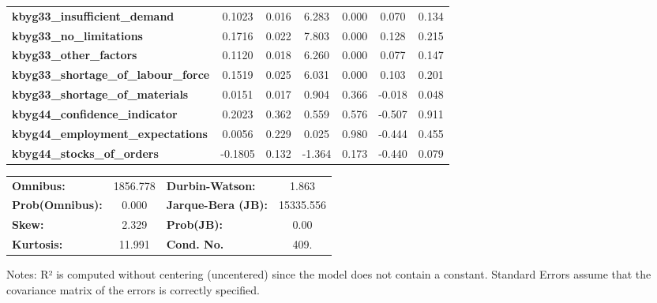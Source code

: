 \begin{center}
\begin{tabular}{lcccccc}
\textbf{kbyg33\_insufficient\_demand}        &       0.1023  &        0.016     &     6.283  &         0.000        &        0.070    &        0.134     \\
\textbf{kbyg33\_no\_limitations}             &       0.1716  &        0.022     &     7.803  &         0.000        &        0.128    &        0.215     \\
\textbf{kbyg33\_other\_factors}              &       0.1120  &        0.018     &     6.260  &         0.000        &        0.077    &        0.147     \\
\textbf{kbyg33\_shortage\_of\_labour\_force} &       0.1519  &        0.025     &     6.031  &         0.000        &        0.103    &        0.201     \\
\textbf{kbyg33\_shortage\_of\_materials}     &       0.0151  &        0.017     &     0.904  &         0.366        &       -0.018    &        0.048     \\
\textbf{kbyg44\_confidence\_indicator}       &       0.2023  &        0.362     &     0.559  &         0.576        &       -0.507    &        0.911     \\
\textbf{kbyg44\_employment\_expectations}    &       0.0056  &        0.229     &     0.025  &         0.980        &       -0.444    &        0.455     \\
\textbf{kbyg44\_stocks\_of\_orders}          &      -0.1805  &        0.132     &    -1.364  &         0.173        &       -0.440    &        0.079     \\
\bottomrule
\end{tabular}
\begin{tabular}{lclc}
\textbf{Omnibus:}       & 1856.778 & \textbf{  Durbin-Watson:     } &     1.863  \\
\textbf{Prob(Omnibus):} &   0.000  & \textbf{  Jarque-Bera (JB):  } & 15335.556  \\
\textbf{Skew:}          &   2.329  & \textbf{  Prob(JB):          } &      0.00  \\
\textbf{Kurtosis:}      &  11.991  & \textbf{  Cond. No.          } &      409.  \\
\bottomrule
\end{tabular}
\end{center}

Notes: \newline
 [1] R² is computed without centering (uncentered) since the model does not contain a constant. \newline
 [2] Standard Errors assume that the covariance matrix of the errors is correctly specified.